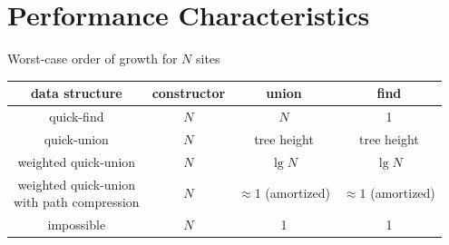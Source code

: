 \documentclass[8pt,a4paper,compress]{beamer}
\begin{document}
\section{Performance Characteristics}
\begin{frame}[fragile]
\pause

Worst-case order of growth for $N$ sites
\begin{center}
\begin{tabular}{cccc}
data structure & constructor & union & find \\ \hline
quick-find & $N$ & $N$ & 1 \\
quick-union & $N$ & tree height & tree height \\
weighted quick-union & $N$ & $\lg N$ & $\lg N$ \\
\makecell{weighted quick-union \\ with path compression} & $N$ & $\approx 1$ (amortized) & $\approx 1$ (amortized) \\
impossible & $N$ & 1 & 1
\end{tabular} 
\end{center}
\end{frame}
\end{document}

